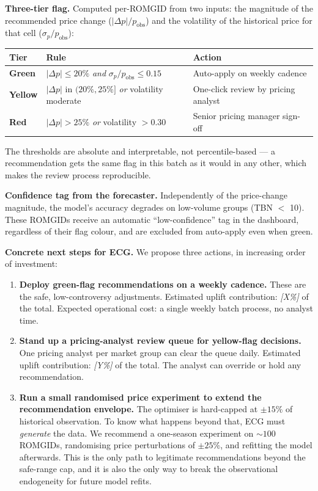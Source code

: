 \documentclass[11pt,a4paper]{article}
\begin{document}
\textbf{Three-tier flag.} Computed per-ROMGID from two inputs: the magnitude of the recommended price change ($|\Delta p| / p_{\text{obs}}$) and the volatility of the historical price for that cell ($\sigma_p / p_{\text{obs}}$):

\begin{center}
\small
\begin{tabular}{@{}lll@{}}
\toprule
\textbf{Tier} & \textbf{Rule} & \textbf{Action} \\
\midrule
\textbf{\textcolor{accent2}{Green}} & $|\Delta p| \le 20\%$ \emph{and} $\sigma_p / p_{\text{obs}} \le 0.15$ & Auto-apply on weekly cadence \\
\textbf{\textcolor{accent4}{Yellow}} & $|\Delta p|$ in $(20\%, 25\%]$ \emph{or} volatility moderate & One-click review by pricing analyst \\
\textbf{\textcolor{accent3}{Red}} & $|\Delta p| > 25\%$ \emph{or} volatility $> 0.30$ & Senior pricing manager sign-off \\
\bottomrule
\end{tabular}
\end{center}

\noindent The thresholds are absolute and interpretable, not percentile-based --- a recommendation gets the same flag in this batch as it would in any other, which makes the review process reproducible.

\textbf{Confidence tag from the forecaster.} Independently of the price-change magnitude, the model's accuracy degrades on low-volume groups (TBN $<$ 10). These ROMGIDs receive an automatic ``low-confidence'' tag in the dashboard, regardless of their flag colour, and are excluded from auto-apply even when green.

\textbf{Concrete next steps for ECG.} We propose three actions, in increasing order of investment:

\begin{enumerate}
  \item \textbf{Deploy green-flag recommendations on a weekly cadence.} These are the safe, low-controversy adjustments. Estimated uplift contribution: \emph{[X\%]} of the total. Expected operational cost: a single weekly batch process, no analyst time.
  \item \textbf{Stand up a pricing-analyst review queue for yellow-flag decisions.} One pricing analyst per market group can clear the queue daily. Estimated uplift contribution: \emph{[Y\%]} of the total. The analyst can override or hold any recommendation.
  \item \textbf{Run a small randomised price experiment to extend the recommendation envelope.} The optimiser is hard-capped at $\pm 15\%$ of historical observation. To know what happens beyond that, ECG must \emph{generate} the data. We recommend a one-season experiment on $\sim 100$ ROMGIDs, randomising price perturbations of $\pm 25\%$, and refitting the model afterwards. This is the only path to legitimate recommendations beyond the safe-range cap, and it is also the only way to break the observational endogeneity for future model refits.
\end{enumerate}
\end{document}

